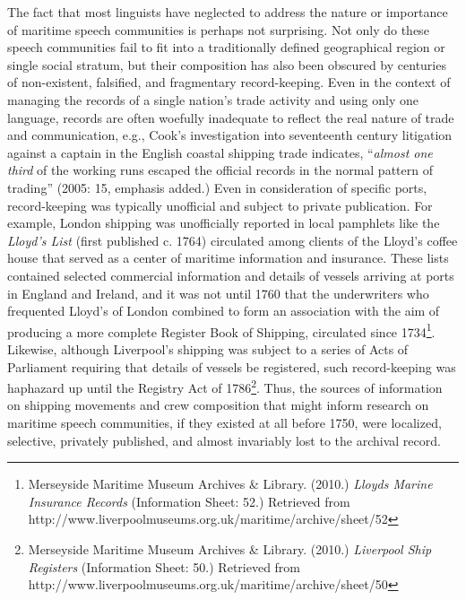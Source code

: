 The fact that most linguists have neglected to address the nature or importance of maritime speech communities is perhaps not surprising. Not only do these speech communities fail to fit into a traditionally defined geographical region or single social stratum, but their composition has also been obscured by centuries of non-existent, falsified, and fragmentary record-keeping. Even in the context of managing the records of a single nation’s trade activity and using only one language, records are often woefully inadequate to reflect the real nature of trade and communication, e.g., Cook’s investigation into seventeenth century litigation against a captain in the English coastal shipping trade indicates, “\textit{almost one third} of the working runs escaped the official records in the normal pattern of trading” (2005: 15, emphasis added.) Even in consideration of specific ports, record-keeping was typically unofficial and subject to private publication. For example, London shipping was unofficially reported in local pamphlets like the \textit{Lloyd's List} (first published c. 1764) circulated among clients of the Lloyd’s coffee house that served as a center of maritime information and insurance. These lists contained selected commercial information and details of vessels arriving at ports in England and Ireland, and it was not until 1760 that the underwriters who frequented Lloyd’s of London combined to form an association with the aim of producing a more complete Register Book of Shipping, circulated since 1734\footnote{Merseyside Maritime Museum Archives \& Library. (2010.)  \textit{Lloyds Marine Insurance Records} (Information Sheet: 52.) Retrieved from http://www.liverpoolmuseums.org.uk/maritime/archive/sheet/52}. Likewise, although Liverpool’s shipping was subject to a series of Acts of Parliament requiring that details of vessels be registered, such record-keeping was haphazard up until the Registry Act of 1786\footnote{Merseyside Maritime Museum Archives \& Library. (2010.)  \textit{Liverpool Ship Registers} (Information Sheet: 50.) Retrieved from http://www.liverpoolmuseums.org.uk/maritime/archive/sheet/50}. Thus, the sources of information on shipping movements and crew composition that might inform research on maritime speech communities, if they existed at all before 1750, were localized, selective, privately published, and almost invariably lost to the archival record. 

